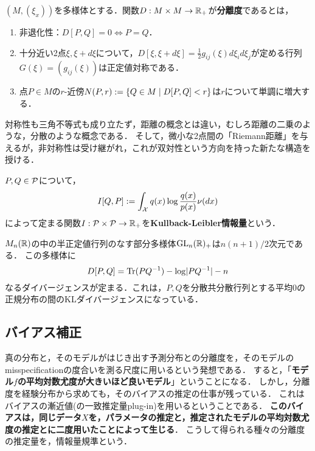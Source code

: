 \documentclass[uplatex,dvipdfmx]{jsreport}
\begin{document}
\begin{definition}[divergence]
    $(M,(\xi_x))$を多様体とする．関数$D:M\times M\to\R_+$が\textbf{分離度}であるとは，
    \begin{enumerate}
        \item 非退化性：$D[P,Q]=0\Leftrightarrow P=Q$．
        \item 十分近い2点$\xi,\xi+d\xi$について，$D[\xi,\xi+d\xi]=\frac{1}{2}g_{ij}(\xi)d\xi_id\xi_j$が定める行列$G(\xi)=(g_{ij}(\xi))$は正定値対称である．
        \item 点$P\in M$の$r$-近傍$N(P,r):=\Brace{Q\in M\mid D[P,Q]<r}$は$r$について単調に増大する．
    \end{enumerate}
\end{definition}
\begin{remarks}
    対称性も三角不等式も成り立たず，距離の概念とは違い，むしろ距離の二乗のような，分散のような概念である．
    そして，微小な2点間の「Riemann距離」を与えるが，非対称性は受け継がれ，これが双対性という方向を持った新たな構造を授ける．
\end{remarks}

\begin{definition}
    $P,Q\in\P$について，
    \[I[Q,P]:=\int_\X q(x)\log\frac{q(x)}{p(x)}\nu(dx)\]
    によって定まる関数$I:\P\times\P\to\R_+$を\textbf{Kullback-Leibler情報量}という．
\end{definition}

\begin{example}[正規分布族のKL分離度]
    $M_n(\R)$の中の半正定値行列のなす部分多様体$\GL_n(\R)_+$は$n(n+1)/2$次元である．
    この多様体に
    \[D[P,Q]=\Tr(PQ^{-1})-\log\abs{PQ^{-1}}-n\]
    なるダイバージェンスが定まる．これは，$P,Q$を分散共分散行列とする平均$0$の正規分布の間のKLダイバージェンスになっている．
\end{example}

\subsection{バイアス補正}

\begin{tcolorbox}[colframe=ForestGreen, colback=ForestGreen!10!white,breakable,colbacktitle=ForestGreen!40!white,coltitle=black,fonttitle=\bfseries\sffamily,
title=]
    真の分布と，そのモデルがはじき出す予測分布との分離度を，そのモデルのmisspecificationの度合いを測る尺度に用いるという発想である．
    すると，「\textbf{モデル$f$の平均対数尤度が大きいほど良いモデル}」ということになる．
    しかし，分離度を経験分布から求めても，そのバイアスの推定の仕事が残っている．
    これはバイアスの漸近値(の一致推定量plug-in)を用いるということである．
    \textbf{このバイアスは，同じデータ$X$を，パラメータの推定と，推定されたモデルの平均対数尤度の推定とに二度用いたことによって生じる}．
    こうして得られる種々の分離度の推定量を，情報量規準という．
\end{tcolorbox}
\end{document}
